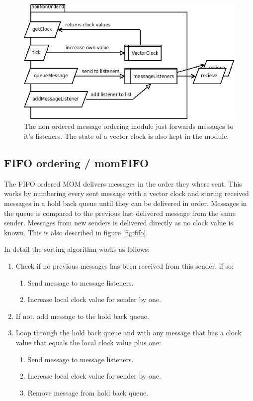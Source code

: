 \documentclass[a4paper,english]{article}
\begin{document}
\begin{figure}
\includegraphics[width=\textwidth]{momNonOrderd.png}
\caption{The non ordered message ordering module just forwards messages to it's listeners. The state of a vector clock is also kept in the module.}
\label{fig:nonorderd}
\end{figure}

\subsection{FIFO ordering / momFIFO}
\label{mo-fifo}
The FIFO ordered MOM delivers messages in the order they where sent. This works by numbering every sent message with a vector clock and storing received messages in a hold back queue until they can be delivered in order. Messages in the queue is compared to the previous last delivered message from the same sender. Messages from new senders is delivered directly as no clock value is known. This is also described in figure \vref{fig:fifo}.

In detail the sorting algorithm works as follows:
\begin{enumerate}
\item Check if no previous messages has been received from this sender, if so:
	\begin{enumerate}
	\item Send message to message listeners.
	\item Increase local clock value for sender by one.
	\end{enumerate}
\item If not, add message to the hold back queue.
\item Loop through the hold back queue and with any message that has a clock value that equals the local clock value plus one:
	\begin{enumerate}
	\item Send message to message listeners.
	\item Increase local clock value for sender by one.
	\item Remove message from hold back queue.
	\end{enumerate}
\end{enumerate}
\end{document}
